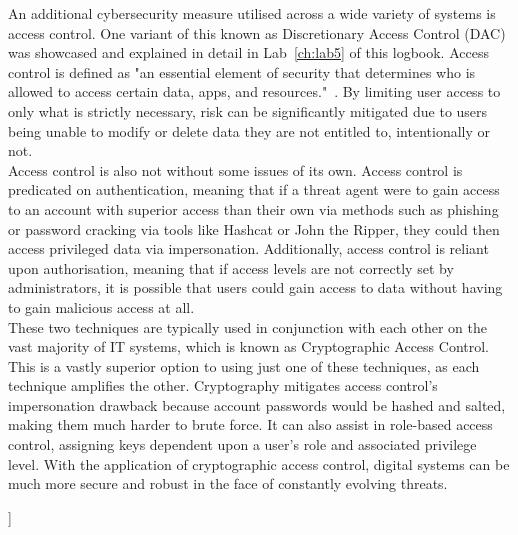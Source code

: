 \documentclass[12pt]{report}
\begin{document}
    \noindent An additional cybersecurity measure utilised across a wide variety of systems is access control.
    One variant of this known as Discretionary Access Control (DAC) was showcased and explained in detail
    in Lab~\ref{ch:lab5} of this logbook.
    Access control is defined as "an essential element of security that determines who is allowed to
    access certain data, apps, and resources."~\autocite{AccessControlMS}.
    By limiting user access to only what is strictly necessary, risk can be significantly mitigated due to
    users being unable to modify or delete data they are not entitled to, intentionally or not.\\

    \noindent Access control is also not without some issues of its own.
    Access control is predicated on authentication, meaning that if a threat agent were to gain access to an account
    with superior access than their own via methods such as phishing or password cracking via tools like Hashcat or
    John the Ripper, they could then access privileged data via impersonation.
    Additionally, access control is reliant upon authorisation, meaning that if access levels are not correctly
    set by administrators, it is possible that users could gain access to data without having to gain malicious
    access at all.\\

    \noindent These two techniques are typically used in conjunction with each other on the vast majority of
    IT systems, which is known as Cryptographic Access Control.
    This is a vastly superior option to using just one of these techniques, as each technique amplifies the other.
    Cryptography mitigates access control's impersonation drawback because account passwords
    would be hashed and salted, making them much harder to brute force.
    It can also assist in role-based access control, assigning keys dependent upon a user's role
    and associated privilege level.
    With the application of cryptographic access control, digital systems can be much more secure and robust
    in the face of constantly evolving threats.


    \printbibliography[title=Bibliography~~~~~~~~~~~~~~~~~~~~~~~\footnotesize{In order of appearance}]]
\end{document}
